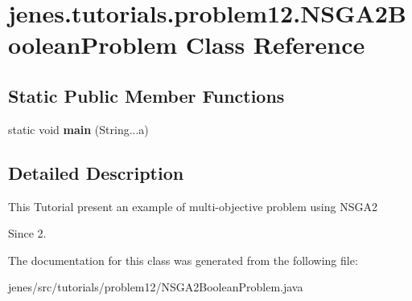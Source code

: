 \hypertarget{classjenes_1_1tutorials_1_1problem12_1_1_n_s_g_a2_boolean_problem}{\section{jenes.\-tutorials.\-problem12.\-N\-S\-G\-A2\-Boolean\-Problem Class Reference}
\label{classjenes_1_1tutorials_1_1problem12_1_1_n_s_g_a2_boolean_problem}
}
\subsection*{Static Public Member Functions}
\begin{DoxyCompactItemize}
\item 
\hypertarget{classjenes_1_1tutorials_1_1problem12_1_1_n_s_g_a2_boolean_problem_a37194152e497fa12a3fca58d85eac4f4}{static void {\bfseries main} (String...\-a)}\label{classjenes_1_1tutorials_1_1problem12_1_1_n_s_g_a2_boolean_problem_a37194152e497fa12a3fca58d85eac4f4}

\end{DoxyCompactItemize}


\subsection{Detailed Description}
This Tutorial present an example of multi-\/objective problem using N\-S\-G\-A2

\begin{DoxySince}{Since}
2. 
\end{DoxySince}


The documentation for this class was generated from the following file\-:\begin{DoxyCompactItemize}
\item 
jenes/src/tutorials/problem12/N\-S\-G\-A2\-Boolean\-Problem.\-java\end{DoxyCompactItemize}
